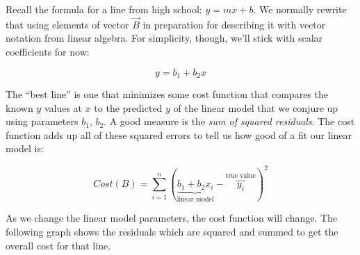 \begin{fullwidth}
Recall the formula for a line from high school: $y = m x + b$.  We normally rewrite that using elements of vector $\vec{B}$ in preparation for describing it with vector notation from linear algebra. For simplicity,  though, we'll stick with scalar coefficients for now:

\[
y = b_1 + b_2 x
\]

The ``best line'' is one that minimizes some cost function that compares the known $y$ values at $x$ to the predicted $y$ of the linear model that we conjure up using parameters $b_1$, $b_2$. A good measure is the {\em sum of squared residuals}. The cost function adds up all of these squared errors to tell us how good of a fit our linear model is:

\[
Cost(B) = \sum_{i=1}^{n}(\underbrace{b_1 + b_2 x_i}_\text{linear model} - \overbrace{y_i}^\text{true value})^2
\]

\noindent As we change the linear model parameters, the cost function will change.  The following graph shows the residuals which are squared and summed to get the overall cost for that line.

\\


\end{fullwidth}

